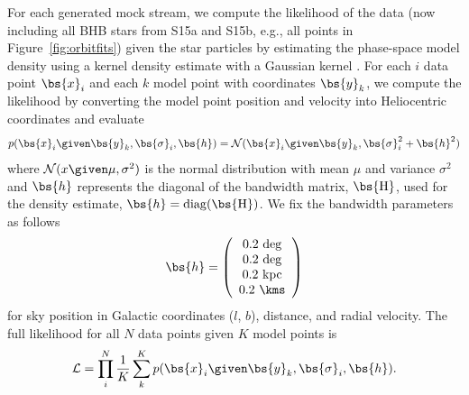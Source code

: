 \documentclass[letterpaper,12pt,preprint]{aastex}
\begin{document}
For each generated mock stream, we compute the likelihood of the data (now including all BHB stars from S15a and S15b, e.g., all points in Figure~\ref{fig:orbitfits}) given the star particles by estimating the phase-space model density using a kernel density estimate with a Gaussian kernel \citep[see, e.g.,][]{bonaca14}. For each $i$ data point $\bs{x}_i$ and each $k$ model point with coordinates $\bs{y}_k$, we compute the likelihood by converting the model point position and velocity into Heliocentric coordinates and evaluate
\begin{align}
	p(\bs{x}_i \given \bs{y}_k, \bs{\sigma}_i, \bs{h}) = \mathcal{N}(\bs{x}_i \given \bs{y}_k, \bs{\sigma}_i^2 +\bs{h}^2)
\end{align}
where $\mathcal{N}(x\given \mu,\sigma^2)$ is the normal distribution with mean $\mu$ and variance $\sigma^2$ and $\bs{h}$ represents the diagonal of the bandwidth matrix, $\bs{\rm H}$, used for the density estimate, $\bs{h} = {\rm diag}(\bs{\rm H})$. We fix the bandwidth parameters as follows
\begin{equation}
	\bs{h} = \left(
	\begin{array}{c}
	0.2~{\rm deg}\\
	0.2~{\rm deg}\\
	0.2~{\rm kpc}\\
	0.2~\kms
	\end{array}
	\right)
\end{equation} %
for sky position in Galactic coordinates ($l$, $b$), distance, and radial velocity. The full likelihood for all $N$ data points given $K$ model points is 
\begin{equation}
	\mathcal{L} = \prod_i^N \frac{1}{K} \sum_k^K p(\bs{x}_i \given \bs{y}_k, \bs{\sigma}_i, \bs{h}).
\end{equation}
\end{document}
